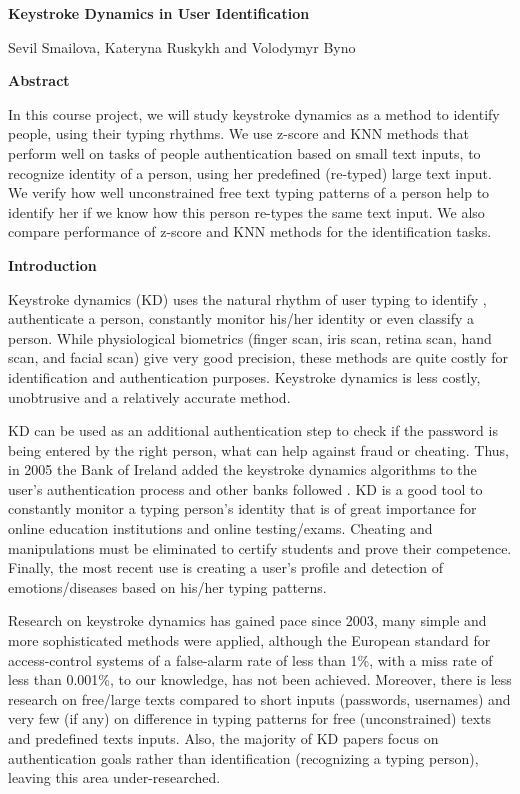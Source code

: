 \documentclass[12pt,a4]{article}
\begin{document}
\begin{center}
  \Huge\bf{Keystroke Dynamics in User Identification}
\end{center}

\begin{center}
	Sevil Smailova, Kateryna Ruskykh and Volodymyr Byno
\end{center}

\large\textbf{Abstract}
\bigskip

\normalsize
In this course project, we will study keystroke dynamics as a method to identify people, using their typing rhythms. We use z-score and KNN methods that perform well on tasks of people authentication based on small text inputs, to recognize identity of a person, using her predefined (re-typed) large text input. We verify how well unconstrained free text typing patterns of a person help to identify her if we know how this person re-types the same text input. We also compare performance of z-score and KNN methods for the identification tasks.

\bigskip

\large\textbf{Introduction}
\bigskip

\normalsize
Keystroke dynamics (KD) uses the natural rhythm of user typing to identify , authenticate a person, constantly monitor his/her identity or even classify a person.  While physiological biometrics (finger scan, iris scan, retina scan, hand scan, and facial scan) give very good precision, these methods are quite costly for identification and authentication purposes. Keystroke dynamics is less costly, unobtrusive and a relatively accurate method.

KD can be used as an additional authentication step to check if the password is being entered by the right person, what can help against fraud or cheating. Thus, in 2005 the Bank of Ireland added the keystroke dynamics algorithms to the user's authentication process and other banks followed \cite{usman1970strengthening}. KD is a good tool to constantly monitor a typing person's identity that is of great importance for online education institutions and online testing/exams. Cheating and manipulations must be eliminated to certify students and prove their competence. Finally, the most recent use is creating a user's profile and detection of emotions/diseases based on his/her typing patterns.

Research on keystroke dynamics has gained pace since 2003, many simple and more sophisticated methods were applied, although the  European standard for access-control systems of a false-alarm rate of less than 1\%, with a miss rate of less than 0.001\%, to our knowledge, has not been achieved. Moreover, there is less research on free/large texts compared to short inputs (passwords, usernames) and very few (if any) on difference in typing patterns for free (unconstrained) texts and predefined texts inputs. Also, the majority of KD papers focus on authentication goals rather than identification (recognizing a typing person), leaving this area under-researched.
\end{document}

